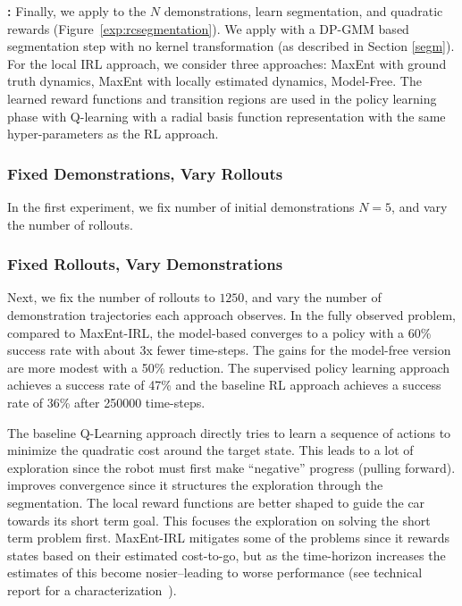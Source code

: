 \vspace{0.25em}\noindent \textbf{\hirl: } Finally, we apply \hirl to the $N$ demonstrations, learn segmentation, and quadratic rewards (Figure~\ref{exp:rcsegmentation}).
We apply \hirl with a DP-GMM based segmentation step with no kernel transformation (as described in Section \ref{segm}).
For the local IRL approach, we consider three approaches: MaxEnt with ground truth dynamics, MaxEnt with locally estimated dynamics, Model-Free. 
The learned reward functions and transition regions are used in the policy learning phase with Q-learning with a radial basis function representation with the same hyper-parameters as the RL approach.

\vspace{0.5em}

\subsubsection{Fixed Demonstrations, Vary Rollouts}
In the first experiment, we fix number of initial demonstrations $N=5$, and vary the number of rollouts.

\subsubsection{Fixed Rollouts, Vary Demonstrations}
Next, we fix the number of rollouts to $1250$, and vary the number of demonstration trajectories each approach observes.
In the fully observed problem, compared to MaxEnt-IRL, the model-based \hirl converges to a policy with a 60\% success rate with about 3x fewer time-steps.
The gains for the model-free version are more modest with a 50\% reduction.
The supervised policy learning approach achieves a success rate of 47\% and the baseline RL approach achieves a success rate of 36\% after 250000 time-steps.

The baseline Q-Learning approach directly tries to learn a sequence of actions to minimize the quadratic cost around the target state. 
This leads to a lot of exploration since the robot must first make ``negative'' progress (pulling forward). 
\hirl improves convergence since it structures the exploration through the segmentation.
The local reward functions are better shaped to guide the car towards its short term goal.
This focuses the exploration on solving the short term problem first.
MaxEnt-IRL mitigates some of the problems since it rewards states based on their estimated cost-to-go, but as the time-horizon increases the estimates of this become nosier--leading to worse performance (see technical report for a characterization~\cite{krishnan2016hirl}).


